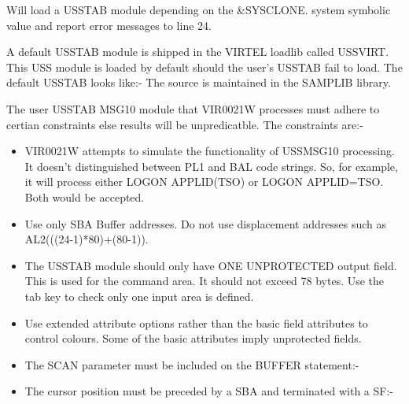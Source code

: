 \documentclass[letterpaper,10pt,english]{sphinxmanual}
\begin{document}
Will load a USSTAB module depending on the \&SYSCLONE. system symbolic value and report error messages to line 24.

A default USSTAB module is shipped in the VIRTEL loadlib called USSVIRT. This USS module is loaded by default should the user’s USSTAB fail to load. The default USSTAB looks like:- The source is maintained in the SAMPLIB library.



The user USSTAB MSG10 module that VIR0021W processes must adhere to certian constraints else results will be unpredicatble. The constraints are:-
\begin{itemize}
\item {} 
VIR0021W attempts to simulate the functionality of USSMSG10 processing. It doesn’t distinguished between PL1 and BAL code strings. So, for example, it will process either  LOGON APPLID(TSO) or LOGON APPLID=TSO. Both would be accepted.

\item {} 
Use only SBA Buffer addresses. Do not use displacement addresses such as AL2(((24-1)*80)+(80-1)).

\item {} 
The USSTAB module should only have ONE UNPROTECTED output field. This is used for the command area. It should not exceed 78 bytes. Use the tab key to check only one input area is defined.

\item {} 
Use extended attribute options rather than the basic field attributes to control colours. Some of the basic attributes imply unprotected fields.

\item {} 
The SCAN parameter must be included on the BUFFER statement:-

\end{itemize}

\begin{sphinxVerbatim}[commandchars=\\\{\}]
      
\end{sphinxVerbatim}
\begin{itemize}
\item {} 
The cursor position must be preceded by a SBA and terminated with a SF:-

\end{itemize}
\end{document}
